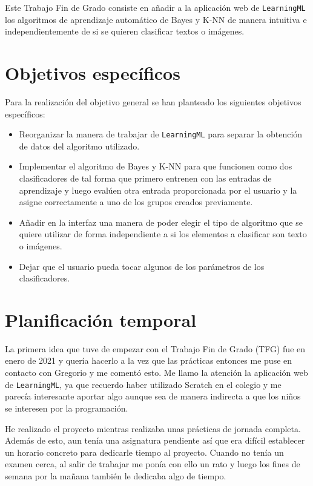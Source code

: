 \documentclass[a4paper, 12pt]{book}
\begin{document}
Este Trabajo Fin de Grado consiste en añadir a la aplicación web de \texttt{LearningML} los algoritmos de aprendizaje automático de Bayes y K-NN de manera intuitiva e independientemente de si se quieren clasificar textos o imágenes.

\section{Objetivos específicos}
\label{sec:objetivos-especificos}

Para la realización del objetivo general se han planteado los siguientes objetivos específicos:
\begin{itemize}
 
	\item Reorganizar la manera de trabajar de \texttt{LearningML} para separar la obtención de datos del algoritmo utilizado.
 
	\item Implementar el algoritmo de Bayes y K-NN para que funcionen como dos clasificadores de tal forma que primero entrenen con las entradas de aprendizaje y luego evalúen otra entrada proporcionada por el usuario y la asigne correctamente a uno de los grupos creados previamente.
 
	\item Añadir en la interfaz una manera de poder elegir el tipo de algoritmo que se quiere utilizar de forma independiente a si los elementos a clasificar son texto o imágenes.

	\item Dejar que el usuario pueda tocar algunos de los parámetros de los clasificadores.

\end{itemize}


\section{Planificación temporal}
\label{sec:planificacion-temporal}

La primera idea que tuve de empezar con el Trabajo Fin de Grado (TFG) fue en enero de 2021 y quería hacerlo a la vez que las prácticas entonces me puse en contacto con Gregorio y me comentó esto. Me llamo la atención la aplicación web de \texttt{LearningML}, ya que recuerdo haber utilizado Scratch en el colegio y me parecía interesante aportar algo aunque sea de manera indirecta a que los niños se interesen por la programación.

He realizado el proyecto mientras realizaba unas prácticas de jornada completa. Además de esto, aun tenía una asignatura pendiente así que era difícil establecer un horario concreto para dedicarle tiempo al proyecto. Cuando no tenía un examen cerca, al salir de trabajar me ponía con ello un rato y luego los fines de semana por la mañana también le dedicaba algo de tiempo.
\end{document}
